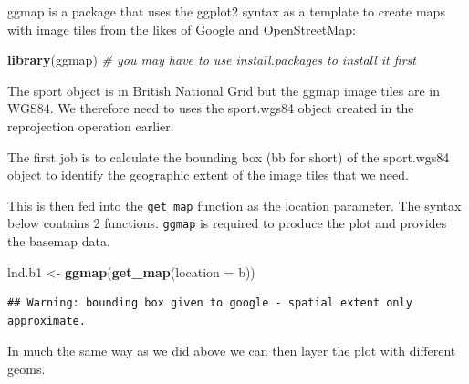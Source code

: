 \documentclass[]{article}
\newenvironment{Shaded}{}{}
\newcommand{\KeywordTok}[1]{\textcolor[rgb]{0.00,0.44,0.13}{\textbf{{#1}}}}
\newcommand{\DataTypeTok}[1]{\textcolor[rgb]{0.56,0.13,0.00}{{#1}}}
\newcommand{\DecValTok}[1]{\textcolor[rgb]{0.25,0.63,0.44}{{#1}}}
\newcommand{\FloatTok}[1]{\textcolor[rgb]{0.25,0.63,0.44}{{#1}}}
\newcommand{\CommentTok}[1]{\textcolor[rgb]{0.38,0.63,0.69}{\textit{{#1}}}}
\newcommand{\NormalTok}[1]{{#1}}
\begin{document}
ggmap is a package that uses the ggplot2 syntax as a template to create
maps with image tiles from the likes of Google and OpenStreetMap:

\begin{Shaded}
\begin{Highlighting}[]
\KeywordTok{library}\NormalTok{(ggmap)  }\CommentTok{# you may have to use install.packages to install it first}
\end{Highlighting}
\end{Shaded}
The sport object is in British National Grid but the ggmap image tiles
are in WGS84. We therefore need to uses the sport.wgs84 object created
in the reprojection operation earlier.

The first job is to calculate the bounding box (bb for short) of the
sport.wgs84 object to identify the geographic extent of the image tiles
that we need.

\begin{Shaded}
\end{Shaded}
This is then fed into the \texttt{get\_map} function as the location
parameter. The syntax below contains 2 functions. \texttt{ggmap} is
required to produce the plot and provides the basemap data.

\begin{Shaded}
\begin{Highlighting}[]
\NormalTok{lnd.b1 <- }\KeywordTok{ggmap}\NormalTok{(}\KeywordTok{get_map}\NormalTok{(}\DataTypeTok{location =} \NormalTok{b))}
\end{Highlighting}
\end{Shaded}
\begin{verbatim}
## Warning: bounding box given to google - spatial extent only approximate.
\end{verbatim}
In much the same way as we did above we can then layer the plot with
different geoms.
\end{document}
